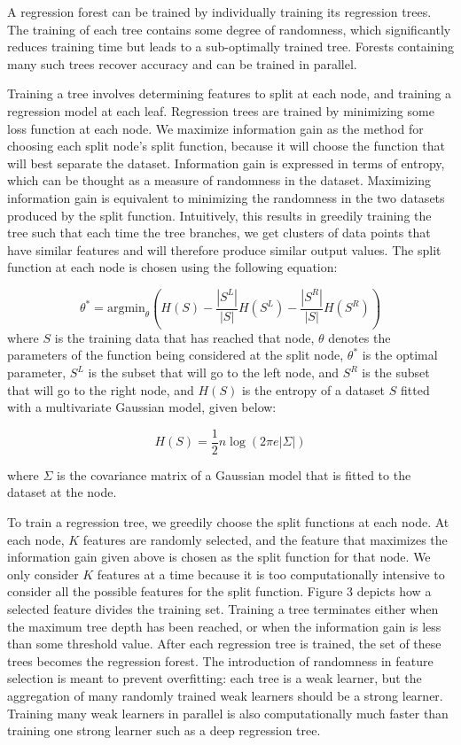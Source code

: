 A regression forest can be trained by individually training its regression trees. The training of each tree contains some degree of randomness, which significantly reduces training time but leads to a sub-optimally trained tree. Forests containing many such trees recover accuracy and can be trained in parallel.

Training a tree involves determining features to split at each node, and training a regression model at each leaf. Regression trees are trained by minimizing some loss function at each node. We maximize information gain as the method for choosing each split node's split function, because it will choose the function that will best separate the dataset. Information gain is expressed in terms of entropy, which can be thought as a measure of randomness in the dataset. Maximizing information gain is equivalent to minimizing the randomness in the two datasets produced by the split function. Intuitively, this results in greedily training the tree such that each time the tree branches, we get clusters of data points that have similar features and will therefore produce similar output values. The split function at each node is chosen using the following equation:

\begin{equation}
  \theta^* = \text{argmin}_{\theta}(H(S) - \frac{|S^L|}{|S|} H(S^L) - \frac{|S^R|}{|S|} H(S^R))
\end{equation}
where $S$ is the training data that has reached that node, $\theta$ denotes the parameters of the function being considered at the split node, $\theta^*$ is the optimal parameter, $S^L$ is the subset that will go to the left node, and $S^R$ is the subset that will go to the right node, and $H(S)$ is the entropy of a dataset $S$ fitted with a multivariate Gaussian model, given below:

\begin{equation}
  H(S) = \frac{1}{2} n \log(2\pi e  |\Sigma|)
\end{equation}

where $\Sigma$ is the covariance matrix of a Gaussian model that is fitted to the dataset at the node.

To train a regression tree, we greedily choose the split functions at each node. At each node, $K$ features are randomly selected, and the feature that maximizes the information gain given above is chosen as the split function for that node. We only consider $K$ features at a time because it is too computationally intensive to consider all the possible features for the split function. Figure 3 depicts how a selected feature divides the training set. Training a tree terminates either when the maximum tree depth has been reached, or when the information gain is less than some threshold value. After each regression tree is trained, the set of these trees becomes the regression forest. The introduction of randomness in feature selection is meant to prevent overfitting: each tree is a weak learner, but the aggregation of many randomly trained weak learners should be a strong learner. Training many weak learners in parallel is also computationally much faster than training one strong learner such as a deep regression tree.

